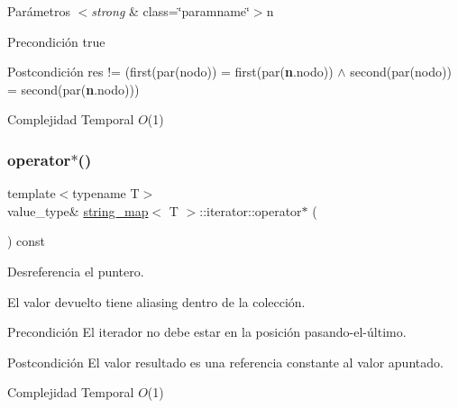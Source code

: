 \begin{DoxyParams}{Parámetros}
{\em $<$strong} & class=\char`\"{}paramname\char`\"{}$>$n\\
\hline
\end{DoxyParams}
\begin{DoxyPrecond}{Precondición}
true 
\end{DoxyPrecond}
\begin{DoxyPostcond}{Postcondición}
res != (first(par(nodo)) = first(par({\bfseries n}.nodo)) $\land$ second(par(nodo)) = second(par({\bfseries n}.nodo)))
\end{DoxyPostcond}

\begin{DoxyDescription}
\item[Complejidad Temporal]$O$(1)
\end{DoxyDescription}\mbox{\label{classstring__map_1_1iterator_a038260842d444e91f54e58ce7b0c8bcb}} 
\subsubsection{\texorpdfstring{operator$\ast$()}{operator*()}}
{\footnotesize\ttfamily template$<$typename T$>$ \\
value\+\_\+type\& \mbox{\hyperlink{classstring__map}{string\+\_\+map}}$<$ T $>$\+::iterator\+::operator$\ast$ (\begin{DoxyParamCaption}{ }\end{DoxyParamCaption}) const\hspace{0.3cm}{\ttfamily [inline]}}



Desreferencia el puntero. 

El valor devuelto tiene aliasing dentro de la colección.

\begin{DoxyPrecond}{Precondición}
El iterador no debe estar en la posición pasando-\/el-\/último. 
\end{DoxyPrecond}
\begin{DoxyPostcond}{Postcondición}
El valor resultado es una referencia constante al valor apuntado.
\end{DoxyPostcond}

\begin{DoxyDescription}
\item[Complejidad Temporal]$O$(1)
\end{DoxyDescription}\mbox{\label{classstring__map_1_1iterator_a778cc925cf490cea0d6093a7d477413f}} 
